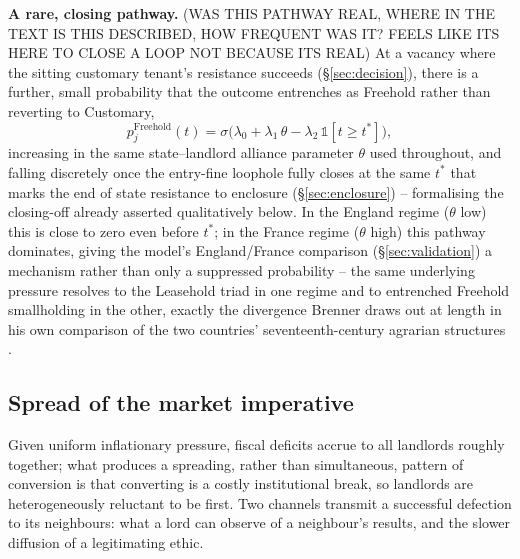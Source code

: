 \documentclass[11pt,english]{article}
\begin{document}
\textbf{A rare, closing pathway.} (WAS THIS PATHWAY REAL, WHERE IN THE TEXT IS THIS DESCRIBED, HOW FREQUENT WAS IT? FEELS LIKE ITS HERE TO CLOSE A LOOP NOT BECAUSE ITS REAL) At a vacancy where the sitting customary tenant's resistance succeeds (\S\ref{sec:decision}), there is a further, small probability that the outcome entrenches as Freehold rather than reverting to Customary,
\begin{equation}
p_j^{\text{Freehold}}(t) = \sigma\big(\lambda_0 + \lambda_1\,\theta - \lambda_2\,\mathbb{1}[t\ge t^{*}]\big),
\end{equation}
increasing in the same state--landlord alliance parameter $\theta$ used throughout, and falling discretely once the entry-fine loophole fully closes at the same $t^{*}$ that marks the end of state resistance to enclosure (\S\ref{sec:enclosure}) -- formalising the closing-off already asserted qualitatively below. In the England regime ($\theta$ low) this is close to zero even before $t^*$; in the France regime ($\theta$ high) this pathway dominates, giving the model's England/France comparison (\S\ref{sec:validation}) a mechanism rather than only a suppressed probability -- the same underlying pressure resolves to the Leasehold triad in one regime and to entrenched Freehold smallholding in the other, exactly the divergence Brenner draws out at length in his own comparison of the two countries' seventeenth-century agrarian structures \cite[p.68-75]{brenner1976agrarian}.

\subsection{Spread of the market imperative}
\label{sec:spread}

Given uniform inflationary pressure, fiscal deficits accrue to all landlords roughly together; what produces a spreading, rather than simultaneous, pattern of conversion is that converting is a costly institutional break, so landlords are heterogeneously reluctant to be first. Two channels transmit a successful defection to its neighbours: what a lord can observe of a neighbour's results, and the slower diffusion of a legitimating ethic.
\end{document}
